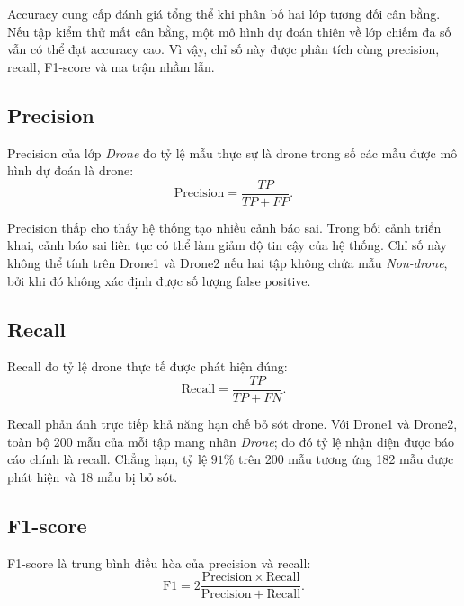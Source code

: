 \documentclass[../DoAn.tex]{subfiles}
\begin{document}
Accuracy cung cấp đánh giá tổng thể khi phân bố hai lớp tương đối cân bằng. Nếu tập kiểm thử mất cân bằng, một mô hình dự đoán thiên về lớp chiếm đa số vẫn có thể đạt accuracy cao. Vì vậy, chỉ số này được phân tích cùng precision, recall, F1-score và ma trận nhầm lẫn.

\subsection{Precision}

Precision của lớp \textit{Drone} đo tỷ lệ mẫu thực sự là drone trong số các mẫu được mô hình dự đoán là drone:
\begin{equation}
    \mathrm{Precision}
    =
    \frac{TP}{TP+FP}.
    \label{eq:precision_ch4}
\end{equation}

Precision thấp cho thấy hệ thống tạo nhiều cảnh báo sai. Trong bối cảnh triển khai, cảnh báo sai liên tục có thể làm giảm độ tin cậy của hệ thống. Chỉ số này không thể tính trên Drone1 và Drone2 nếu hai tập không chứa mẫu \textit{Non-drone}, bởi khi đó không xác định được số lượng false positive.

\subsection{Recall}

Recall đo tỷ lệ drone thực tế được phát hiện đúng:
\begin{equation}
    \mathrm{Recall}
    =
    \frac{TP}{TP+FN}.
    \label{eq:recall_ch4}
\end{equation}

Recall phản ánh trực tiếp khả năng hạn chế bỏ sót drone. Với Drone1 và Drone2, toàn bộ 200 mẫu của mỗi tập mang nhãn \textit{Drone}; do đó tỷ lệ nhận diện được báo cáo chính là recall. Chẳng hạn, tỷ lệ $91\%$ trên 200 mẫu tương ứng 182 mẫu được phát hiện và 18 mẫu bị bỏ sót.

\subsection{F1-score}

F1-score là trung bình điều hòa của precision và recall:
\begin{equation}
    \mathrm{F1}
    =
    2
    \frac{
        \mathrm{Precision}\times\mathrm{Recall}
    }{
        \mathrm{Precision}+\mathrm{Recall}
    }.
    \label{eq:f1_ch4}
\end{equation}
\end{document}
